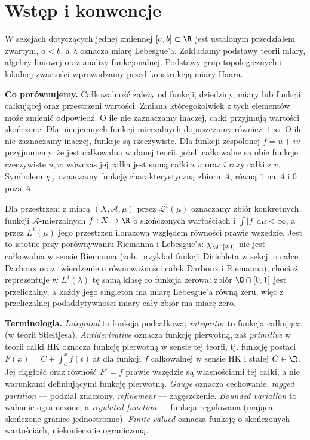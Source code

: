\section*{Wstęp i konwencje}
W sekcjach dotyczących jednej zmiennej $[a,b]\subset\R$ jest ustalonym przedziałem zwartym, $a<b$, a $\lambda$ oznacza miarę Lebesgue'a. Zakładamy podstawy teorii miary, algebry liniowej oraz analizy funkcjonalnej. Podstawy grup topologicznych i lokalnej zwartości wprowadzamy przed konstrukcją miary Haara.

\textbf{Co porównujemy.} Całkowalność zależy od funkcji, dziedziny, miary lub funkcji całkującej oraz przestrzeni wartości. Zmiana któregokolwiek z tych elementów może zmienić odpowiedź. O ile nie zaznaczamy inaczej, całki przyjmują wartości skończone. Dla nieujemnych funkcji mierzalnych dopuszczamy również $+\infty$. O ile nie zaznaczamy inaczej, funkcje są rzeczywiste. Dla funkcji zespolonej $f=u+iv$ przyjmujemy, że jest całkowalna w danej teorii, jeżeli całkowalne są obie funkcje rzeczywiste $u,v$; wówczas jej całka jest sumą całki z $u$ oraz $i$ razy całki z $v$. Symbolem $\chi_A$ oznaczamy funkcję charakterystyczną zbioru $A$, równą $1$ na $A$ i $0$ poza $A$.

Dla przestrzeni z miarą $(X,\mathcal A,\mu)$ przez $\mathcal L^1(\mu)$ oznaczamy zbiór konkretnych funkcji $\mathcal A$-mierzalnych $f:X\to\R$ o skończonych wartościach i $\int |f|\,\mathrm d\mu<\infty$, a przez $L^1(\mu)$ jego przestrzeń ilorazową względem równości prawie wszędzie. Jest to istotne przy porównywaniu Riemanna i Lebesgue'a: $\chi_{\Q\cap[0,1]}$ nie jest całkowalna w sensie Riemanna (zob. przykład funkcji Dirichleta w sekcji o całce Darboux oraz twierdzenie o równoważności całek Darboux i Riemanna), chociaż reprezentuje w $L^1(\lambda)$ tę samą klasę co funkcja zerowa: zbiór $\Q\cap[0,1]$ jest przeliczalny, a każdy jego singleton ma miarę Lebesgue'a równą zeru, więc z przeliczalnej podaddytywności miary cały zbiór ma miarę zero.

\textbf{Terminologia.} \emph{Integrand} to funkcja podcałkowa; \emph{integrator} to funkcja całkująca (w teorii Stieltjesa). \emph{Antiderivative} oznacza funkcję pierwotną, zaś \emph{primitive} w teorii całki HK oznacza funkcję pierwotną w sensie tej teorii, tj. funkcję postaci $F(x)=C+\int_a^x f(t)\,\mathrm dt$ dla funkcji $f$ całkowalnej w sensie HK i stałej $C\in\R$. Jej ciągłość oraz równość $F'=f$ prawie wszędzie są własnościami tej całki, a nie warunkami definiującymi funkcję pierwotną. \emph{Gauge} oznacza cechowanie, \emph{tagged partition} --- podział znaczony, \emph{refinement} --- zagęszczenie. \emph{Bounded variation} to wahanie ograniczone, a \emph{regulated function} --- funkcja regulowana (mająca skończone granice jednostronne). \emph{Finite-valued} oznacza funkcję o skończonych wartościach, niekoniecznie ograniczoną.

